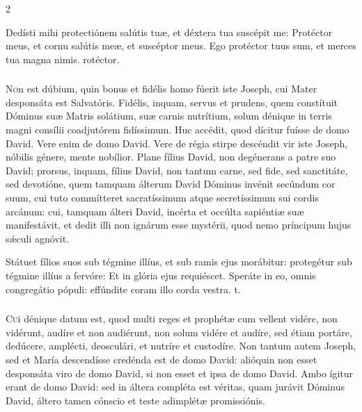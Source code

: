 \documentclass[9pt,twoside]{extarticle}
\begin{document}
\begin{multicols}{2}
\begin{tightlist}{}
\item {} Dedísti mihi protectiónem salútis tuæ, et déxtera tua suscépit me: \textred{*} Protéctor meus, et cornu salútis meæ, et suscéptor meus.  Ego protéctor tuus sum, et merces tua magna nimis. rotéctor.
\end{tightlist}

\subsubsection*{\center {}}
\lettrine{N}on est dúbium, quin bonus et fidélis homo fúerit iste Joseph, cui Mater desponsáta est Salvatóris. Fidélis, inquam, servus et prudens, quem constítuit Dóminus suæ Matris solátium, suæ carnis nutrítium, solum dénique in terris magni consílii coadjutórem fidíssimum. Huc accédit, quod dícitur fuísse de domo David. Vere enim de domo David. Vere de régia stirpe descéndit vir iste Joseph, nóbilis génere, mente nobílior. Plane fílius David, non degénerans a patre suo David; prorsus, inquam, fílius David, non tantum carne, sed fide, sed sanctitáte, sed devotióne, quem tamquam álterum David Dóminus invénit secúndum cor suum, cui tuto commítteret sacratíssimum atque secretíssimum sui cordis arcánum: cui, tamquam álteri David, incérta et occúlta sapiéntiæ suæ manifestávit, et dedit illi non ignárum esse mystérii, quod nemo príncipum hujus sǽculi agnóvit.

\begin{tightlist}{}
\item {} Státuet fílios suos sub tégmine illíus, et sub ramis ejus morábitur: protegétur sub tégmine illíus a fervóre: \textred{*} Et in glória ejus requiéscet.  Speráte in eo, omnis congregátio pópuli: effúndite coram illo corda vestra. t.
\end{tightlist}

\subsubsection*{\center {}}
\lettrine{C}ui dénique datum est, quod multi reges et prophétæ cum vellent vidére, non vidérunt, audíre et non audiérunt, non solum vidére et audíre, sed étiam portáre, dedúcere, amplécti, deosculári, et nutríre et custodíre. Non tantum autem Joseph, sed et María descendísse credénda est de domo David: alióquin non esset desponsáta viro de domo David, si non esset et ipsa de domo David. Ambo ígitur erant de domo David: sed in áltera compléta est véritas, quam jurávit Dóminus David, áltero tamen cónscio et teste adimplétæ promissiónis.


\end{multicols}
\end{document}
